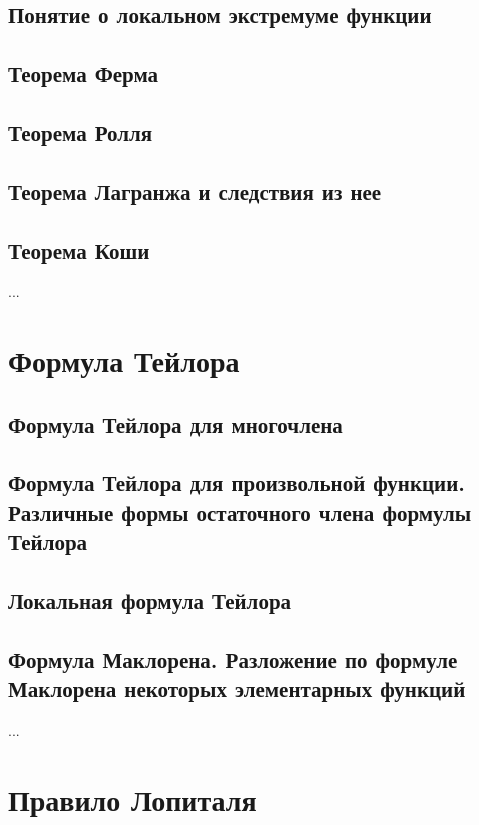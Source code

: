 \subsection{Понятие о локальном экстремуме функции}

\subsection{Теорема Ферма}

\subsection{Теорема Ролля}

\subsection{Теорема Лагранжа и следствия из нее}

\subsection{Теорема Коши}
...

\section{Формула Тейлора}
\subsection{Формула Тейлора для многочлена}
\subsection{Формула Тейлора для произвольной функции. Различные формы остаточного члена формулы Тейлора}
\subsection{Локальная формула Тейлора}
\subsection{Формула Маклорена. Разложение по формуле Маклорена некоторых элементарных функций}
...

\section{Правило Лопиталя}

